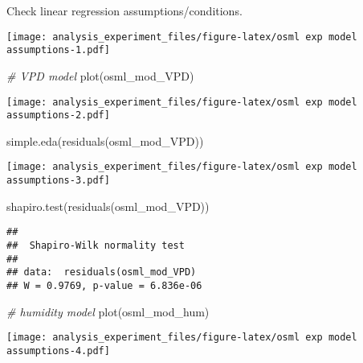 \documentclass[
]{article}
\newenvironment{Shaded}{\begin{snugshade}}{\end{snugshade}}
\newcommand{\CommentTok}[1]{\textcolor[rgb]{0.56,0.35,0.01}{\textit{#1}}}
\newcommand{\FunctionTok}[1]{\textcolor[rgb]{0.00,0.00,0.00}{#1}}
\newcommand{\NormalTok}[1]{#1}
\newcommand{\SpecialCharTok}[1]{\textcolor[rgb]{0.00,0.00,0.00}{#1}}
\begin{document}
Check linear regression assumptions/conditions.

\begin{Shaded}
\end{Shaded}

\texttt{[image: analysis\_experiment\_files/figure-latex/osml exp model assumptions-1.pdf]}

\begin{Shaded}
\begin{Highlighting}[]
\CommentTok{\# VPD model}
\FunctionTok{plot}\NormalTok{(osml\_mod\_VPD)}
\end{Highlighting}
\end{Shaded}

\texttt{[image: analysis\_experiment\_files/figure-latex/osml exp model assumptions-2.pdf]}

\begin{Shaded}
\begin{Highlighting}[]
\FunctionTok{simple.eda}\NormalTok{(}\FunctionTok{residuals}\NormalTok{(osml\_mod\_VPD))}
\end{Highlighting}
\end{Shaded}

\texttt{[image: analysis\_experiment\_files/figure-latex/osml exp model assumptions-3.pdf]}

\begin{Shaded}
\begin{Highlighting}[]
\FunctionTok{shapiro.test}\NormalTok{(}\FunctionTok{residuals}\NormalTok{(osml\_mod\_VPD))}
\end{Highlighting}
\end{Shaded}

\begin{verbatim}
## 
##  Shapiro-Wilk normality test
## 
## data:  residuals(osml_mod_VPD)
## W = 0.9769, p-value = 6.836e-06
\end{verbatim}

\begin{Shaded}
\begin{Highlighting}[]
\CommentTok{\# humidity model}
\FunctionTok{plot}\NormalTok{(osml\_mod\_hum)}
\end{Highlighting}
\end{Shaded}

\texttt{[image: analysis\_experiment\_files/figure-latex/osml exp model assumptions-4.pdf]}
\end{document}
